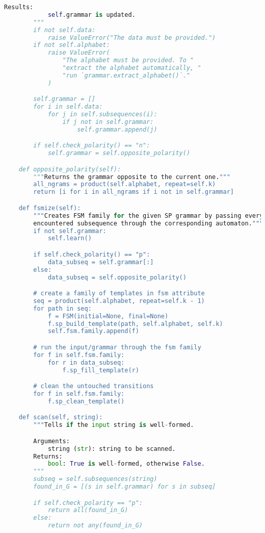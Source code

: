 \begin{lstlisting}[language=Python]
        Results:
            self.grammar is updated.
        """
        if not self.data:
            raise ValueError("The data must be provided.")
        if not self.alphabet:
            raise ValueError(
                "The alphabet must be provided. To "
                "extract the alphabet automatically, "
                "run `grammar.extract_alphabet()`."
            )

        self.grammar = []
        for i in self.data:
            for j in self.subsequences(i):
                if j not in self.grammar:
                    self.grammar.append(j)

        if self.check_polarity() == "n":
            self.grammar = self.opposite_polarity()

    def opposite_polarity(self):
        """Returns the grammar opposite to the current one."""
        all_ngrams = product(self.alphabet, repeat=self.k)
        return [i for i in all_ngrams if i not in self.grammar]

    def fsmize(self):
        """Creates FSM family for the given SP grammar by passing every
        encountered subsequence through the corresponding automaton."""
        if not self.grammar:
            self.learn()

        if self.check_polarity() == "p":
            data_subseq = self.grammar[:]
        else:
            data_subseq = self.opposite_polarity()

        # create a family of templates in fsm attribute
        seq = product(self.alphabet, repeat=self.k - 1)
        for path in seq:
            f = FSM(initial=None, final=None)
            f.sp_build_template(path, self.alphabet, self.k)
            self.fsm.family.append(f)

        # run the input/grammar through the fsm family
        for f in self.fsm.family:
            for r in data_subseq:
                f.sp_fill_template(r)

        # clean the untouched transitions
        for f in self.fsm.family:
            f.sp_clean_template()

    def scan(self, string):
        """Tells if the input string is well-formed.

        Arguments:
            string (str): string to be scanned.
        Returns:
            bool: True is well-formed, otherwise False.
        """
        subseq = self.subsequences(string)
        found_in_G = [(s in self.grammar) for s in subseq]

        if self.check_polarity == "p":
            return all(found_in_G)
        else:
            return not any(found_in_G)


\end{lstlisting}
